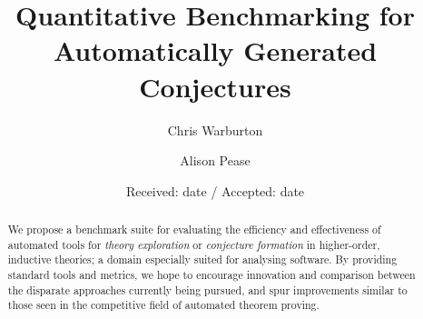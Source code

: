 


\title{Quantitative Benchmarking for Automatically Generated Conjectures%
}


\author{Chris Warburton \and
        Alison Pease
}



\date{Received: date / Accepted: date}

\maketitle



\begin{abstract}
  We propose a benchmark suite for evaluating the efficiency and effectiveness
  of automated tools for \emph{theory exploration} or
  \emph{conjecture formation} in higher-order, inductive theories; a domain
  especially suited for analysing software. By providing standard tools and
  metrics, we hope to encourage innovation and comparison between the disparate
  approaches currently being pursued, and spur improvements similar to those
  seen in the competitive field of automated theorem proving.
\end{abstract}

